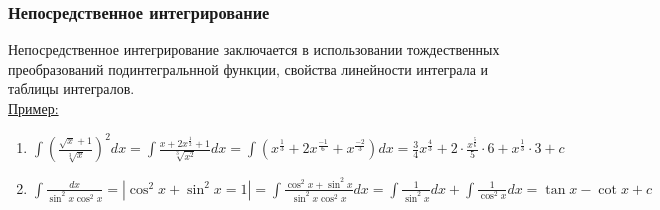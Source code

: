 \documentclass[a4paper,12pt]{article}
\theoremstyle{remark}
\begin{document}
\subsubsection{Непосредственное интегрирование}
Непосредственное интегрирование заключается в использовании тождественных преобразований подинтегральнной функции, свойства линейности интеграла и таблицы интегралов.\\
\underline{Пример:} 
\begin{enumerate}
	\item $\int(\frac{\sqrt{x}+1}{\sqrt[3]{x}})^2dx=\int\frac{x+2x^{\frac{1}{2}}+1}{\sqrt[3]{x^2}}dx=\int(x^{\frac{1}{3}}+2x^{\frac{-1}{6}}+x^{\frac{-2}{3}})dx=\frac{3}{4}x^{\frac{4}{3}}+2\cdot\frac{x^{\frac{5}{6}}}{5}\cdot 6+x^{\frac{1}{3}}\cdot 3+c$
	\item $\int\frac{dx}{\sin^2x\cos^2x}=|\cos^2x+\sin^2x=1|=\int\frac{\cos^2x+\sin^2x}{\sin^2x\cos^2x}dx=\int\frac{1}{\sin^2x}dx+\int\frac{1}{\cos^2x}dx=\tan x-\cot x+c$
\end{enumerate}
\end{document}
